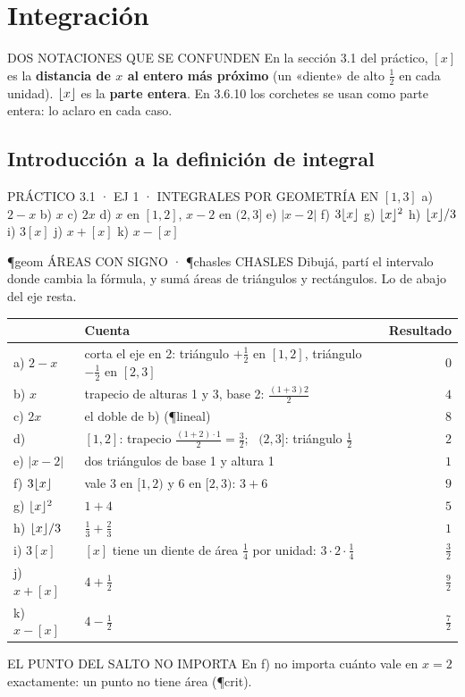 \chapter{Integración}

\begin{memo}{DOS NOTACIONES QUE SE CONFUNDEN}
En la sección 3.1 del práctico, $[x]$ es la \textbf{distancia de $x$ al entero más próximo} (un «diente» de alto $\frac12$ en cada unidad). $\lfloor x\rfloor$ es la \textbf{parte entera}. En 3.6.10 los corchetes se usan como parte entera: lo aclaro en cada caso.
\end{memo}

\section{Introducción a la definición de integral}

\begin{enunciado}{PRÁCTICO 3.1 · EJ 1 · INTEGRALES POR GEOMETRÍA EN $[1,3]$}
a) $2-x$ b) $x$ c) $2x$ d) $x$ en $[1,2]$, $x-2$ en $(2,3]$ e) $|x-2|$ f) $3\lfloor x\rfloor$ g) $\lfloor x\rfloor^2$ h) $\lfloor x\rfloor/3$ i) $3[x]$ j) $x+[x]$ k) $x-[x]$
\end{enunciado}
\begin{uso}{\P{geom} ÁREAS CON SIGNO · \P{chasles} CHASLES}
Dibujá, partí el intervalo donde cambia la fórmula, y sumá áreas de triángulos y rectángulos. Lo de abajo del eje resta.
\end{uso}
\begin{center}\small
\begin{tabularx}{\linewidth}{@{}l X r@{}}\toprule
& Cuenta & Resultado\\\midrule
a) $2-x$ & corta el eje en 2: triángulo $+\frac12$ en $[1,2]$, triángulo $-\frac12$ en $[2,3]$ & $0$\\
b) $x$ & trapecio de alturas 1 y 3, base 2: $\frac{(1+3)2}2$ & $4$\\
c) $2x$ & el doble de b) (\P{lineal}) & $8$\\
d) & $[1,2]$: trapecio $\frac{(1+2)\cdot1}2=\frac32$; \ $(2,3]$: triángulo $\frac12$ & $2$\\
e) $|x-2|$ & dos triángulos de base 1 y altura 1 & $1$\\
f) $3\lfloor x\rfloor$ & vale 3 en $[1,2)$ y 6 en $[2,3)$: $3+6$ & $9$\\
g) $\lfloor x\rfloor^2$ & $1+4$ & $5$\\
h) $\lfloor x\rfloor/3$ & $\frac13+\frac23$ & $1$\\
i) $3[x]$ & $[x]$ tiene un diente de área $\frac14$ por unidad: $3\cdot2\cdot\frac14$ & $\frac32$\\
j) $x+[x]$ & $4+\frac12$ & $\frac92$\\
k) $x-[x]$ & $4-\frac12$ & $\frac72$\\\bottomrule
\end{tabularx}
\end{center}
\begin{trampa}{EL PUNTO DEL SALTO NO IMPORTA}
En f) no importa cuánto vale en $x=2$ exactamente: un punto no tiene área (\P{crit}).
\end{trampa}

